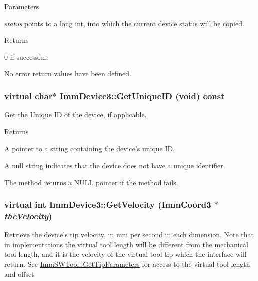 \begin{DoxyParams}{Parameters}
\item[{\em status}]points to a long int, into which the current device status will be copied.\end{DoxyParams}
\begin{DoxyReturn}{Returns}

\end{DoxyReturn}
0 if successful.

No error return values have been defined. \hypertarget{classImmDevice3_adc9ebc761484c239995fcdb4cd778f4c}{
\subsubsection[{GetUniqueID}]{\setlength{\rightskip}{0pt plus 5cm}virtual char$\ast$ ImmDevice3::GetUniqueID (void) const}}
\label{classImmDevice3_adc9ebc761484c239995fcdb4cd778f4c}
Get the Unique ID of the device, if applicable.

\begin{DoxyReturn}{Returns}

\end{DoxyReturn}
A pointer to a string containing the device's unique ID.

A null string indicates that the device does not have a unique identifier.

The method returns a NULL pointer if the method fails. \hypertarget{classImmDevice3_a5e54ca3f7d4ef1bc73f81505a930beac}{
\subsubsection[{GetVelocity}]{\setlength{\rightskip}{0pt plus 5cm}virtual int ImmDevice3::GetVelocity ({\bf ImmCoord3} $\ast$ {\em theVelocity})}}
\label{classImmDevice3_a5e54ca3f7d4ef1bc73f81505a930beac}
Retrieve the device's tip velocity, in mm per second in each dimension. Note that in implementations the virtual tool length will be different from the mechanical tool length, and it is the velocity of the virtual tool tip which the interface will return. See \hyperlink{classImmSWTool_afa3068b7a4575c255654378134f524c0}{ImmSWTool::GetTipParameters} for access to the virtual tool length and offset.


